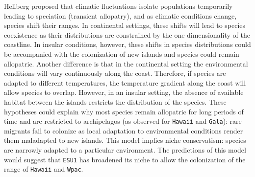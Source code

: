 \documentclass[12pt,letterpaper]{article}\usepackage[]{graphicx}\usepackage[]{color}
\begin{document}
Hellberg \citep{Hellberg1998} proposed that climatic fluctuations isolate
populations temporarily leading to speciation (transient allopatry), and as
climatic conditions change, species shift their ranges. In continental settings,
these shifts will lead to species coexistence as their distributions are
constrained by the one dimensionality of the coastline. In insular conditions,
however, these shifts in species distributions could be accompanied with the
colonization of new islands and species could remain allopatric. Another
difference is that in the continental setting the environmental conditions will
vary continuously along the coast. Therefore, if species are adapted to
different temperatures, the temperature gradient along the coast will allow
species to overlap. However, in an insular setting, the absence of available
habitat between the islands restricts the distribution of the species. These
hypotheses could explain why most species remain allopatric for long periods of
time and are restricted to archipelagos (as observed for \texttt{Hawaii} and
\texttt{Gala}): rare migrants fail to colonize as local adaptation to
environmental conditions render them maladapted to new islands. This model
implies niche conservatism: species are narrowly adapted to a particular
environment. The predictions of this model would suggest that \texttt{ESU1} has
broadened its niche to allow the colonization of the range of \texttt{Hawaii}
and \texttt{Wpac}.



\end{document}
